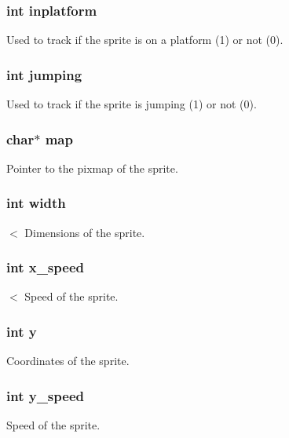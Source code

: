 \subsubsection[{inplatform}]{\setlength{\rightskip}{0pt plus 5cm}int inplatform}\label{group__sprite_ga44675e845628c15d8a696990a9494d04}
Used to track if the sprite is on a platform (1) or not (0). \hypertarget{group__sprite_gad427edc16087f64ef18fb771dd34cc0b}{}
\subsubsection[{jumping}]{\setlength{\rightskip}{0pt plus 5cm}int jumping}\label{group__sprite_gad427edc16087f64ef18fb771dd34cc0b}
Used to track if the sprite is jumping (1) or not (0). \hypertarget{group__sprite_ga7b00b1bfd666e26484471bd17a74eaa9}{}
\subsubsection[{map}]{\setlength{\rightskip}{0pt plus 5cm}char$\ast$ map}\label{group__sprite_ga7b00b1bfd666e26484471bd17a74eaa9}
Pointer to the pixmap of the sprite. \hypertarget{group__sprite_ga2474a5474cbff19523a51eb1de01cda4}{}
\subsubsection[{width}]{\setlength{\rightskip}{0pt plus 5cm}int width}\label{group__sprite_ga2474a5474cbff19523a51eb1de01cda4}
$<$ Dimensions of the sprite. \hypertarget{group__sprite_ga56d83ad8a1afb318706057c1ec72f797}{}
\subsubsection[{x\+\_\+speed}]{\setlength{\rightskip}{0pt plus 5cm}int x\+\_\+speed}\label{group__sprite_ga56d83ad8a1afb318706057c1ec72f797}
$<$ Speed of the sprite. \hypertarget{group__sprite_ga0a2f84ed7838f07779ae24c5a9086d33}{}
\subsubsection[{y}]{\setlength{\rightskip}{0pt plus 5cm}int y}\label{group__sprite_ga0a2f84ed7838f07779ae24c5a9086d33}
Coordinates of the sprite. \hypertarget{group__sprite_ga081c2d7f9619a32bd806baa1831ce1c1}{}
\subsubsection[{y\+\_\+speed}]{\setlength{\rightskip}{0pt plus 5cm}int y\+\_\+speed}\label{group__sprite_ga081c2d7f9619a32bd806baa1831ce1c1}
Speed of the sprite. 